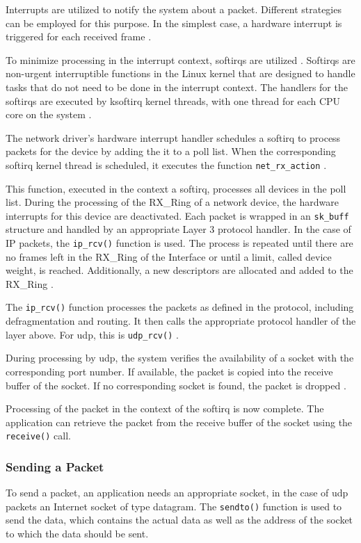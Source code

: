 Interrupts are utilized to notify the system about a packet. Different strategies can be employed for this purpose. In the simplest case, a hardware interrupt is triggered for each received frame \cite{lins06}.

To minimize processing in the interrupt context, softirqs are utilized \cite{lins03}. Softirqs are non-urgent interruptible functions in the Linux kernel that are designed to handle tasks that do not need to be done in the interrupt context. The handlers for the softirqs are executed by ksoftirq kernel threads, with one thread for each \ac{CPU} core on the system \cite{like02}.

The network driver's hardware interrupt handler schedules a softirq to process packets for the device by adding the it to a poll list. When the corresponding softirq kernel thread is scheduled, it executes the function \texttt{net\_rx\_action} \cite{lins03}.

This function, executed in the context a softirq, processes all devices in the poll list. During the processing of the RX\_Ring of a network device, the hardware interrupts for this device are deactivated. Each  packet is wrapped in an \texttt{sk\_buff} structure and handled by an appropriate Layer 3 protocol handler. In the case of IP packets, the \texttt{ip\_rcv()} function is used. The process is repeated until there are no frames left in the RX\_Ring of the Interface or until a limit, called device weight, is reached. Additionally, a new descriptors are allocated and added to the RX\_Ring \cite{lins03, lins13, lins14}.

The \texttt{ip\_rcv()} function processes the packets as defined in the protocol, including defragmentation and routing. It then calls the appropriate protocol handler of the layer above. For \ac{udp}, this is \texttt{udp\_rcv()} \cite{lins01}.

During processing by \ac{udp}, the system verifies the availability of a socket with the corresponding port number. If available, the packet is copied into the receive buffer of the socket. If no corresponding socket is found, the packet is dropped \cite{lins01}.

Processing of the packet in the context of the softirq is now complete. The application can retrieve the packet from the receive buffer of the socket using the \texttt{receive()} call.


\subsubsection{Sending a Packet}
To send a packet, an application needs an appropriate socket, in the case of \ac{udp} packets an Internet socket of type datagram. The \texttt{sendto()} function is used to send the data, which contains the actual data as well as the address of the socket to which the data should be sent.

